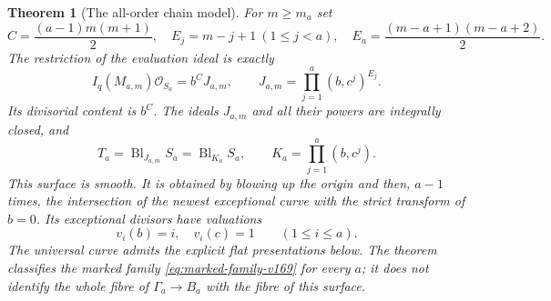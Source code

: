 \documentclass[11pt,reqno]{amsart}
\numberwithin{equation}{section}
\newtheorem{theorem}{Theorem}[section]
\theoremstyle{definition}\newtheorem{definition}[theorem]{Definition}
\theoremstyle{remark}\newtheorem{remark}[theorem]{Remark}
\newcommand{\OO}{\mathcal O}\newcommand{\II}{\mathcal I}
\begin{document}
\begin{theorem}[The all-order chain model]\label{thm:chain-model-v169}
For $m\geq m_a$ set
\[
 C=\frac{(a-1)m(m+1)}2,\quad
 E_j=m-j+1\ (1\leq j<a),\quad
 E_a=\frac{(m-a+1)(m-a+2)}2.
\]
The restriction of the evaluation ideal is exactly
\begin{equation}\label{eq:all-order-factor-v169}
 I_q(M_{a,m})\OO_{S_a}
   =b^C J_{a,m},\qquad
 J_{a,m}=\prod_{j=1}^a(b,c^j)^{E_j}.
\end{equation}
Its divisorial content is $b^C$. The ideals $J_{a,m}$ and all their
powers are integrally closed, and
\begin{equation}\label{eq:chain-blowup-v169}
 T_a=\operatorname{Bl}_{J_{a,m}}S_a
     =\operatorname{Bl}_{K_a}S_a,
 \qquad K_a=\prod_{j=1}^a(b,c^j).
\end{equation}
This surface is smooth. It is obtained by blowing up the origin and
then, $a-1$ times, the intersection of the newest exceptional curve
with the strict transform of $b=0$. Its exceptional divisors have
valuations
\[
 v_i(b)=i,\quad v_i(c)=1\qquad(1\leq i\leq a).
\]
The universal curve admits the explicit flat presentations below.
The theorem classifies the marked family \eqref{eq:marked-family-v169}
for every $a$; it does not identify the whole fibre of $\Gamma_a\to B_a$
with the fibre of this surface.
\end{theorem}
\end{document}

